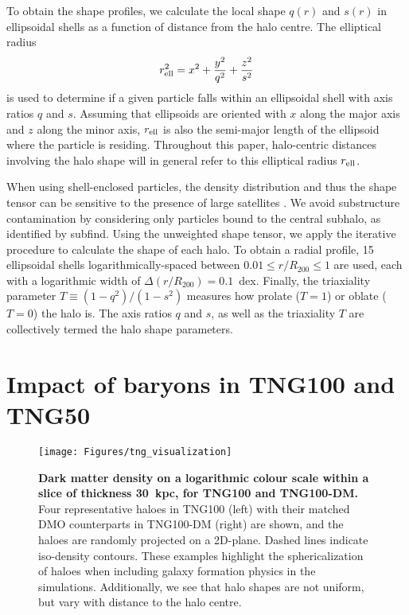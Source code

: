 \documentclass[fleqn,usenatbib]{mnras}
\begin{document}
To obtain the shape profiles, we calculate the local shape $q(r)$ and $s(r)$ in ellipsoidal shells as a function of distance from the halo centre.
The elliptical radius  
 \begin{equation}
 	r_{\rm ell}^2 = x^2 + \frac{y^2}{q^2} + \frac{z^2}{s^2}
 	\label{eqn:rell}
 \end{equation}
is used to determine if a given particle falls within an ellipsoidal shell with axis ratios $q$ and $s$.
Assuming that ellipsoids are oriented with $x$ along the  major axis and $z$ along the minor axis, 
$r_{\rm ell}$ is also the semi-major length of the  ellipsoid where the particle is residing.
Throughout this paper, halo-centric distances involving the halo shape will in general refer to this elliptical radius $r_{\rm ell}$.

When using shell-enclosed particles, the density distribution and thus the shape tensor can be sensitive to the presence of large satellites \citep{Zemp11v197}.
We avoid substructure contamination by considering only particles bound to the central subhalo, as identified by {\sc subfind}.
Using the unweighted shape tensor, we apply the iterative procedure to calculate the shape of each halo.
To obtain a radial profile, 15 ellipsoidal shells logarithmically-spaced between $0.01 \leq r/R_{200} \leq 1$ are used, each with a logarithmic width of $\Delta (r/R_{200}) = 0.1$~dex.
Finally, the triaxiality parameter $T\equiv(1-q^2)/(1-s^2)$ measures how prolate ($T=1$) or oblate ($T=0$) the halo is.
The axis ratios $q$ and $s$, as well as the triaxiality $T$ are collectively termed the halo shape parameters.





\section{Impact of baryons in TNG100 and TNG50}
\label{sec:results}

\begin{figure}
    \centering
    \texttt{[image: Figures/tng\_visualization]}
    \caption{{\bf Dark matter density on a logarithmic colour scale within a slice of thickness 30~kpc, for TNG100 and TNG100-DM.}
    Four representative haloes in TNG100 (left) with their matched DMO counterparts in TNG100-DM (right) are shown, and the haloes are randomly projected on a 2D-plane.
    Dashed lines indicate iso-density contours.
    These examples highlight the sphericalization of haloes when including galaxy formation physics in the simulations.
    Additionally, we see that halo shapes are not uniform, but vary with distance to the halo centre.
    }
    \label{fig:tng100_visualization}
\end{figure}
\end{document}
